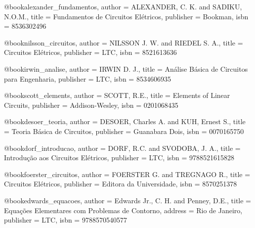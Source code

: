 
%

@book{alexander_fundamentos,
  author = {ALEXANDER, C. K. and SADIKU, N.O.M.},
  title = {Fundamentos de Circuitos Elétricos},
  publisher = {Bookman},
  isbn = {8536302496}
}

@book{nilsson_circuitos,
  author = {NILSSON J. W. and RIEDEL S. A.},
  title = {Circuitos Elétricos},
  publisher = {LTC},
  isbn = {8521613636}
}

@book{irwin_analise,
  author = {IRWIN D. J.},
  title = {Análise Básica de Circuitos para Engenharia},
  publisher = {LTC},
  isbn = {8534606935}
}

@book{scott_elements,
  author = {SCOTT, R.E.},
  title = {Elements of Linear Circuits},
  publisher = {Addison-Wesley},
  isbn = {0201068435}
}

@book{desoer_teoria,
  author = {DESOER, Charles A. and KUH, Ernest S.},
  title = {Teoria Básica de Circuitos},
  publisher = {Guanabara Dois},
  isbn = {0070165750}
}

@book{dorf_introducao,
  author = {DORF, R.C. and SVODOBA, J. A.},
  title = {Introdução aos Circuitos Elétricos},
  publisher = {LTC},
  isbn = {9788521615828}
}

@book{foerster_circuitos,
  author = {FOERSTER G. and TREGNAGO R.},
  title = {Circuitos Elétricos},
  publisher = {Editora da Universidade},
  isbn = {8570251378}
}

%

@book{edwards_equacoes,
  author = {Edwards Jr., C. H. and Penney, D.E.},
  title = {Equações Elementares com Problemas de Contorno},
  address = {Rio de Janeiro},
  publisher = {LTC},
  isbn = {9788570540577}
}

